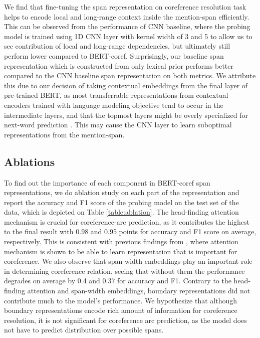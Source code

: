 \documentclass[11pt]{article}
\begin{document}
We find that fine-tuning the span representation on coreference resolution task helps to encode local and long-range context inside the mention-span efficiently. This can be observed from the performance of CNN baseline, where the probing model is trained using 1D CNN layer with kernel width of 3 and 5 to allow us to see contribution of local and long-range dependencies, but ultimately still perform lower compared to BERT-coref. Surprisingly, our baseline span representation which is constructed from only lexical prior performs better compared to the CNN baseline span representation on both metrics. We attribute this due to our decision of taking contextual embeddings from the final layer of pre-trained BERT, as most transferrable representations from contextual encoders trained with language modeling objective tend to occur in the intermediate layers, and that the topmost layers might be overly specialized for next-word prediction \parencite{liu2019linguistic,peters2018elmo,peters-etal-2018-dissecting,blevins-etal-2018-deep,devlin2019bert}. This may cause the CNN layer to learn suboptimal representations from the mention-span.

\subsection{Ablations}
To find out the importance of each component in BERT-coref span representations, we do ablation study on each part of the representation and report the accuracy and F1 score of the probing model on the test set of the data, which is depicted on Table \ref{table:ablation}. The head-finding attention mechanism is crucial for coreference-arc prediction, as it contributes the highest to the final result with 0.98 and 0.95 points for accuracy and F1 score on average, respectively. This is consistent with previous findings from \parencite{lee2017end}, where attention mechanism is shown to be able to learn representation that is important for coreference. We also observe that span-width embeddings play an important role in determining coreference relation, seeing that without them the performance degrades on average by 0.4 and 0.37 for accuracy and F1. Contrary to the head-finding attention and span-width embeddings, boundary representations did not contribute much to the model's performance. We hypothesize that although boundary representations encode rich amount of information for coreference resolution, it is not significant for coreference arc prediction, as the model does not have to predict distribution over possible spans.
\end{document}
